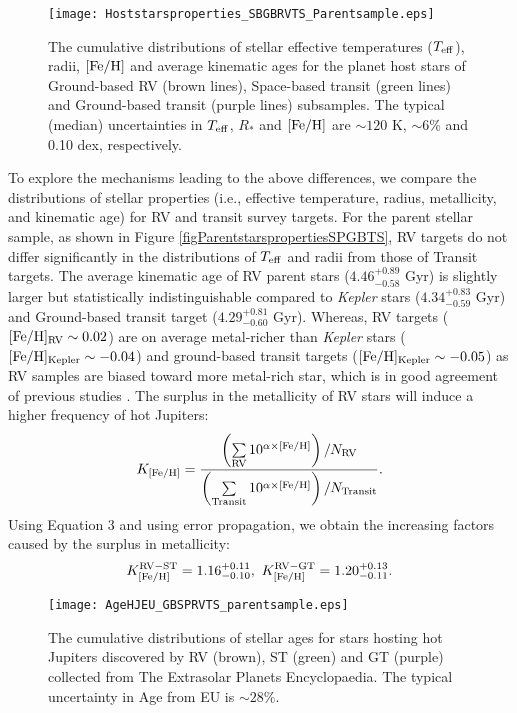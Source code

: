 \documentclass[twocolumn]{pnas-new}
\begin{document}
\begin{figure}[!t]
\centering
\texttt{[image: Hoststarsproperties\_SBGBRVTS\_Parentsample.eps]}
\caption{The cumulative distributions of stellar effective temperatures ($T_{\rm eff}$), radii, $\rm [Fe/H]$ and average kinematic ages for the planet host stars of Ground-based RV (brown lines), Space-based transit (green lines) and Ground-based transit (purple lines) subsamples.
{The typical (median) uncertainties in $T_{\rm eff}$, $R_*$ and $\rm [Fe/H]$ are $\sim 120$ K, $\sim 6\%$ and 0.10 dex, respectively.}
\label{figHoststarspropertiesSPGBTS}}
\end{figure}


To explore the mechanisms leading to the above differences, we compare the distributions of stellar properties (i.e., effective temperature, radius, metallicity, and kinematic age) for RV and transit survey targets.
For the parent stellar sample, as shown in Figure \ref{figParentstarspropertiesSPGBTS}, RV targets do not differ significantly in the
distributions of $T_{\rm eff}$ and radii from those of Transit targets.
The average kinematic age of RV parent stars ($4.46^{+0.89}_{-0.58}$ Gyr) is slightly larger but statistically indistinguishable compared to {\it Kepler} stars ($4.34^{+0.83}_{-0.59}$ Gyr) and Ground-based transit target ($4.29^{+0.81}_{-0.60}$ Gyr).
Whereas, RV targets ($\rm [Fe/H]_{\rm RV} \sim 0.02$) are on average metal-richer than {\it Kepler} stars ($\rm [Fe/H]_{\rm Kepler} \sim -0.04$) and ground-based transit targets ($\rm [Fe/H]_{\rm Kepler} \sim -0.05$) as RV samples are biased toward more metal-rich star, which is in good agreement of previous studies \citep[e.g.,][]{2014ApJ...789L...3D,2017ApJ...838...25G}.
The surplus in the metallicity of RV stars will induce a higher frequency of hot Jupiters:
\begin{equation}
  K_{\rm [Fe/H]} = \frac{\left(\sum\limits_{\rm RV} 10^{\alpha \times [\rm Fe/H]}\right)/N_{\rm RV}}{\left(\sum\limits_{\rm Transit} 10^{\alpha \times [\rm Fe/H]}\right)/N_{\rm Transit}}.
\end{equation}
Using Equation 3 and using error propagation, we obtain the increasing factors caused by the surplus in metallicity:
\begin{equation}
  K^{\rm RV-ST}_{\rm [Fe/H]} = 1.16^{+0.11}_{-0.10}, \ 
  K^{\rm RV-GT}_{\rm [Fe/H]} = 1.20^{+0.13}_{-0.11}. 
\end{equation}

\begin{figure}[!t]
\centering
\texttt{[image: AgeHJEU\_GBSPRVTS\_parentsample.eps]}
\caption{The cumulative distributions of stellar ages for stars hosting hot Jupiters discovered by RV (brown), ST (green) and GT (purple) collected from The Extrasolar Planets Encyclopaedia.
{The typical uncertainty in Age from EU is $\sim 28\%$.}
\label{figAgeHJRVTSEU}}
\end{figure}
\end{document}

